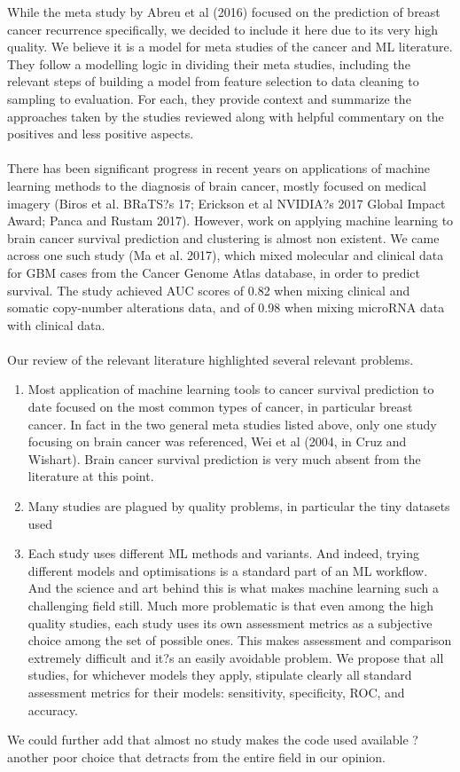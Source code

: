 \documentclass[a4paper]{article}
\begin{document}
While the meta study by Abreu et al (2016) focused on the prediction of breast cancer recurrence specifically, we decided to include it here due to its very high quality. We believe it is a model for meta studies of the cancer and ML literature. They follow a modelling logic in dividing their meta studies, including the relevant steps of building a model from feature selection to data cleaning to sampling to evaluation. For each, they provide context and summarize the approaches taken by the studies reviewed along with helpful commentary on the positives and less positive aspects. \\
\\
There has been significant progress in recent years on applications of machine learning methods to the diagnosis of brain cancer, mostly focused on medical imagery (Biros et al. BRaTS?s 17; Erickson et al NVIDIA?s 2017 Global Impact Award; Panca and Rustam 2017). However, work on applying machine learning to brain cancer survival prediction and clustering is almost non existent. We came across one such study (Ma et al. 2017), which mixed molecular and clinical data for GBM cases from the Cancer Genome Atlas database, in order to predict survival. The study achieved AUC scores of 0.82 when mixing clinical and somatic copy-number alterations data, and of 0.98 when mixing microRNA data with clinical data.\\
\\
Our review of the relevant literature highlighted several relevant problems. 
\begin{enumerate}
\item Most application of machine learning tools to cancer survival prediction to date focused on the most common types of cancer, in particular breast cancer. In fact in the two general meta studies listed above, only one study focusing on brain cancer was referenced, Wei et al (2004, in Cruz and Wishart). Brain cancer survival prediction is very much absent from the literature at this point.
\item Many studies are plagued by quality problems, in particular the tiny datasets used
\item Each study uses different ML methods and variants. And indeed, trying different models and optimisations is a standard part of an ML workflow. And the science and art behind this is what makes machine learning such a challenging field still. Much more problematic is that even among the high quality studies, each study uses its own assessment metrics as a subjective choice among the set of possible ones. This makes assessment and comparison extremely difficult and it?s an easily avoidable problem. We propose that all studies, for whichever models they apply, stipulate clearly all standard assessment metrics for their models: sensitivity, specificity, ROC, and accuracy.
\end{enumerate}
%
We could further add that almost no study makes the code used available ? another poor choice that detracts from the entire field in our opinion.
\end{document}

